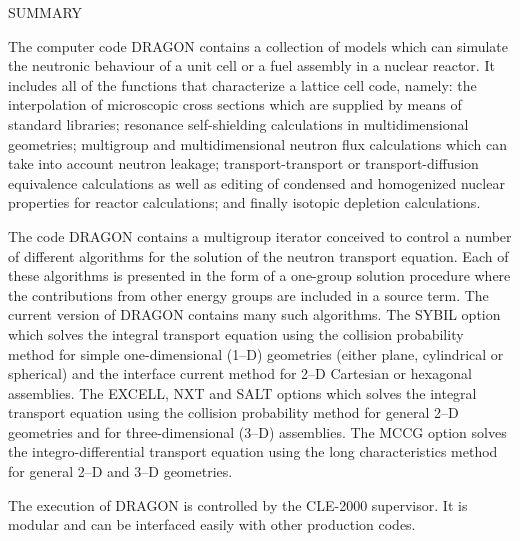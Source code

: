\clearpage
$ $
\vskip 2.0cm

\begin{center}

SUMMARY

\end{center}

The computer code DRAGON contains a collection of models which can simulate the
neutronic behaviour of a unit cell or a fuel assembly in a nuclear reactor. It
includes all of the functions that characterize a lattice cell code, namely: the
interpolation of microscopic cross sections  which are supplied by means of
standard libraries; resonance self-shielding calculations in multidimensional
geometries; multigroup and multidimensional neutron flux calculations which can
take into account neutron leakage; transport-transport or transport-diffusion
equivalence calculations as well as editing of condensed and homogenized nuclear
properties for reactor calculations; and finally isotopic depletion calculations.

\vskip 0.15cm

The code DRAGON contains a multigroup iterator conceived to control a number of
different algorithms for the solution of the neutron transport equation. Each of
these algorithms is presented in the form of a one-group solution procedure
where the contributions from other energy groups are included in a source term.
The current version of DRAGON contains many such algorithms. The
SYBIL option which solves the integral transport equation using the collision
probability method for simple one-dimensional (1--D) geometries (either plane,
cylindrical or spherical) and the interface current method for 2--D Cartesian or hexagonal
assemblies. The EXCELL, NXT and SALT options which solves the integral transport equation
using the collision probability method for general 2--D geometries and for
three-dimensional (3--D) assemblies. The MCCG option solves the integro-differential
transport equation using the long characteristics method for general 2--D and
3--D geometries.

\vskip 0.15cm

The execution of DRAGON is controlled by the CLE-2000 supervisor. It is
modular and can be interfaced easily with other production codes.
